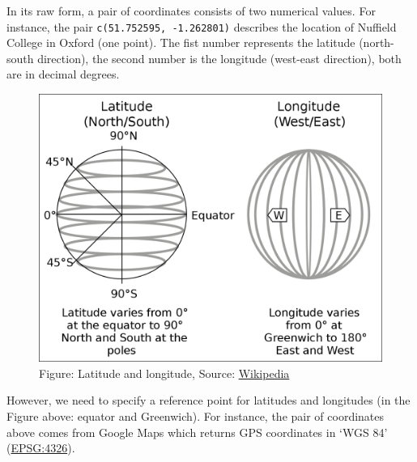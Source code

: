 \documentclass[
  letterpaper,
  DIV=11,
  numbers=noendperiod]{scrreprt}
\begin{document}
In its raw form, a pair of coordinates consists of two numerical values.
For instance, the pair \texttt{c(51.752595,\ -1.262801)} describes the
location of Nuffield College in Oxford (one point). The fist number
represents the latitude (north-south direction), the second number is
the longitude (west-east direction), both are in decimal degrees.

\begin{figure}

{\centering \includegraphics{fig/lat-long.png}

}

\caption{Figure: Latitude and longitude, Source:
\href{https://en.wikipedia.org/wiki/Geographic_coordinate_system}{Wikipedia}}

\end{figure}

However, we need to specify a reference point for latitudes and
longitudes (in the Figure above: equator and Greenwich). For instance,
the pair of coordinates above comes from Google Maps which returns GPS
coordinates in `WGS 84' (\href{https://epsg.io/4326}{EPSG:4326}).
\end{document}
